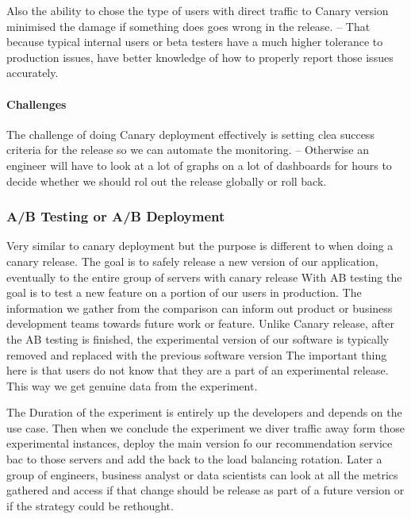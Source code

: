 \documentclass[a4paper, 11pt]{book}
\begin{document}
    Also the ability to chose the type of users with direct traffic to Canary version minimised the damage if something does goes wrong in the release.
    -- That because typical internal users or beta testers have a much higher tolerance to production issues, have better knowledge of how to properly report those issues accurately.

    \paragraph{Challenges}
    The challenge of doing Canary deployment effectively is setting clea success criteria for the release so we can automate the monitoring.
    -- Otherwise an engineer will have to look at a lot of graphs on a lot of dashboards for hours to decide whether we should rol out the release globally or roll back.

    \subsubsection{A/B Testing or A/B Deployment}
    Very similar to canary deployment but the purpose is different to when doing a canary release.
    The goal is to safely release a new version of our application, eventually to the entire group of servers with canary release
    With AB testing the goal is to test a new feature on a portion of our users in production.
    The information we gather from the comparison can inform out product or business development teams towards future work or feature.
    Unlike Canary release, after the AB testing is finished, the experimental version of our software is typically removed and replaced with the previous software version
    The important thing here is that users do not know that they are a part of an experimental release.
    This way we get genuine data from the experiment.

    The Duration of the experiment is entirely up the developers and depends on the use case.
    Then when we conclude the experiment we diver traffic away form those experimental instances, deploy the main version fo our recommendation service bac to those servers and add the back to the load balancing rotation.
    Later a group of engineers, business analyst or data scientists can look at all the metrics gathered and access if that change should be release as part of a future version or if the strategy could be rethought.
\end{document}
